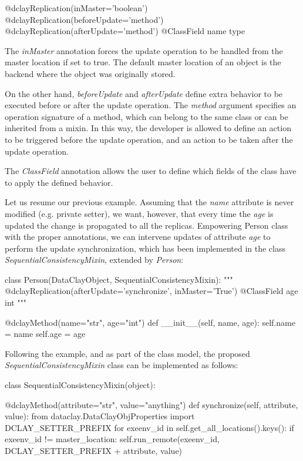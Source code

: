 \begin{tBox}
\begin{python}
@dclayReplication(inMaster='boolean')
@dclayReplication(beforeUpdate='method')
@dclayReplication(afterUpdate='method')
@ClassField name type
\end{python}
\end{tBox}

The \textit{inMaster} annotation forces the update operation to be handled from the master location if set to true. The default master location of an object is the backend where the object was originally stored.

On the other hand, \textit{beforeUpdate} and \textit{afterUpdate} define extra behavior to be executed before or after the update operation. The \textit{method} argument specifies an operation signature of a method, which can belong to the same class or can be inherited from a mixin. In this way, the developer is allowed to define an action to be triggered before the update operation, and an action to be taken after the update operation.

The \textit{ClassField} annotation allows the user to define which fields of the class have to apply the defined behavior.

Let us resume our previous example. Assuming that the \textit{name} attribute is never modified (e.g. private setter), we want, however, that every time the \textit{age} is updated the change is propagated to all the replicas. Empowering Person class with the proper annotations, we can intervene updates of attribute \textit{age} to perform the update synchronization, which has been implemented in the class \textit{SequentialConsistencyMixin}, extended by \textit{Person}:

\begin{tBox}
\begin{python}
class Person(DataClayObject, SequentialConsistencyMixin):
    """ 
    @dclayReplication(afterUpdate='synchronize', inMaster='True')
    @ClassField age int
    """

    @dclayMethod(name="str", age="int")
    def __init__(self, name, age):
        self.name = name
        self.age = age

\end{python}
\end{tBox}

Following the example, and as part of the class model, the proposed \textit{SequentialConsistencyMixin} class can be implemented as follows:
\begin{tBox}
\begin{python}
class SequentialConsistencyMixin(object):

    @dclayMethod(attribute="str", value="anything")
    def synchronize(self, attribute, value):
        from dataclay.DataClayObjProperties import DCLAY_SETTER_PREFIX
        for exeenv_id in self.get_all_locations().keys():
            if exeenv_id != master_location:
                self.run_remote(exeenv_id, DCLAY_SETTER_PREFIX + attribute, value)

\end{python}
\end{tBox}


